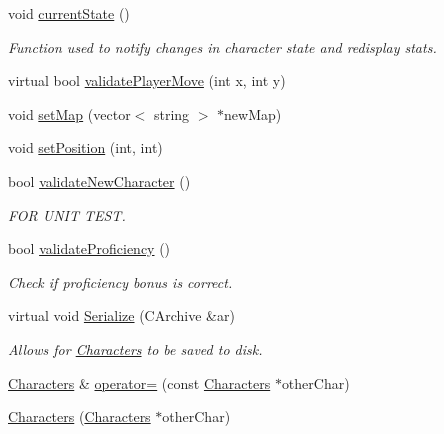 \begin{DoxyCompactItemize}
void \hyperlink{class_characters_a4359f1dd1537ed6fac7f5ff47801e4ca}{current\+State} ()
\begin{DoxyCompactList}\small\item\em Function used to notify changes in character state and redisplay stats. \end{DoxyCompactList}\item 
virtual bool \hyperlink{class_characters_a42bbd977aed8772f446510e7fcfd577f}{validate\+Player\+Move} (int x, int y)
\item 
void \hyperlink{class_characters_a7ea2bd80b72476d35173691d31e80727}{set\+Map} (vector$<$ string $>$ $\ast$new\+Map)
\item 
void \hyperlink{class_characters_a9dac165846c7eb9cacb6a2807a75f845}{set\+Position} (int, int)
\item 
bool \hyperlink{class_characters_a1273e2d7fe2e959cd3ed513c5717f6b7}{validate\+New\+Character} ()
\begin{DoxyCompactList}\small\item\em F\+OR U\+N\+IT T\+E\+ST. \end{DoxyCompactList}\item 
\hypertarget{class_characters_a8a13cb967bd25662f86eac505e3e874a}{}\label{class_characters_a8a13cb967bd25662f86eac505e3e874a} 
bool \hyperlink{class_characters_a8a13cb967bd25662f86eac505e3e874a}{validate\+Proficiency} ()
\begin{DoxyCompactList}\small\item\em Check if proficiency bonus is correct. \end{DoxyCompactList}\item 
\hypertarget{class_characters_ad8eafe3c0b8b2138dc28f4d52050d434}{}\label{class_characters_ad8eafe3c0b8b2138dc28f4d52050d434} 
virtual void \hyperlink{class_characters_ad8eafe3c0b8b2138dc28f4d52050d434}{Serialize} (C\+Archive \&ar)
\begin{DoxyCompactList}\small\item\em Allows for \hyperlink{class_characters}{Characters} to be saved to disk. \end{DoxyCompactList}\item 
\hyperlink{class_characters}{Characters} \& \hyperlink{class_characters_a161bd4230b1ff594c36db697ee2d3707}{operator=} (const \hyperlink{class_characters}{Characters} $\ast$other\+Char)
\item 
\hyperlink{class_characters_a695ed5b59463f54d4eb52a551a25949b}{Characters} (\hyperlink{class_characters}{Characters} $\ast$other\+Char)
\end{DoxyCompactItemize}
